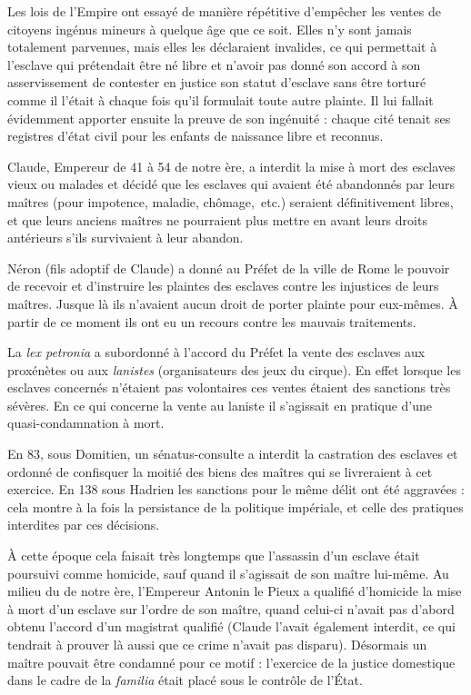 Les lois de l'Empire ont essayé de manière répétitive d'empêcher les ventes de citoyens ingénus mineurs à quelque âge que ce soit. Elles n'y sont jamais totalement parvenues, mais elles les déclaraient invalides, ce qui permettait à l'esclave qui prétendait être né libre et n'avoir pas donné son accord à son asservissement de contester en justice son statut d'esclave sans être torturé comme il l'était à chaque fois qu'il formulait toute autre plainte. Il lui fallait évidemment apporter ensuite la preuve de son ingénuité : chaque cité tenait ses registres d'état civil pour les enfants de naissance libre et reconnus.

 Claude, Empereur de 41 à 54 de notre ère, a interdit la mise à mort des esclaves vieux ou malades et décidé que les esclaves qui avaient été abandonnés par leurs maîtres (pour impotence, maladie, chômage,~etc.) seraient définitivement libres, et que leurs anciens maîtres ne pourraient plus mettre en avant leurs droits antérieurs s'ils survivaient à leur abandon. 

 Néron (fils adoptif de Claude) a donné au Préfet de la ville de Rome le pouvoir de recevoir et d'instruire les plaintes des esclaves contre les injustices de leurs maîtres. Jusque là ils n'avaient aucun droit de porter plainte pour eux-mêmes. À partir de ce moment ils ont eu un recours contre les mauvais traitements.

 La \emph{lex petronia} a subordonné à l'accord du Préfet la vente des esclaves aux proxénètes ou aux \emph{lanistes} (organisateurs des jeux du cirque). En effet lorsque les esclaves concernés n'étaient pas volontaires ces ventes étaient des sanctions très sévères. En ce qui concerne la vente au laniste il s'agissait en pratique d'une quasi-condamnation à mort.

 En 83, sous Domitien, un sénatus-consulte a interdit la castration des esclaves et ordonné de confisquer la moitié des biens des maîtres qui se livreraient à cet exercice. En 138 sous Hadrien les sanctions pour le même délit ont été aggravées : cela montre à la fois la persistance de la politique impériale, et celle des pratiques interdites par ces décisions. 

 À cette époque cela faisait très longtemps que l'assassin d'un esclave était poursuivi comme homicide, sauf quand il s'agissait de son maître lui-même. Au milieu du  de notre ère, l'Empereur Antonin le Pieux a qualifié d'homicide la mise à mort d'un esclave sur l'ordre de son maître, quand celui-ci n'avait pas d'abord obtenu l'accord d'un magistrat qualifié (Claude l'avait également interdit, ce qui tendrait à prouver là aussi que ce crime n'avait pas disparu). Désormais un maître pouvait être condamné pour ce motif : l'exercice de la justice domestique dans le cadre de la \emph{familia} était placé sous le contrôle de l'État.

